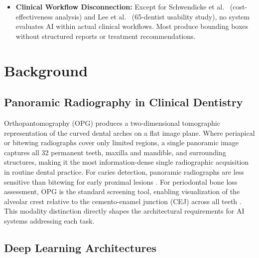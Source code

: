 \documentclass[conference]{IEEEtran}
\begin{document}
\begin{itemize}
    \item \textbf{Clinical Workflow Disconnection:} Except for
          Schwendicke et al.\ \cite{schwendicke2021cost}
          (cost-effectiveness analysis) and Lee et al.\
          \cite{lee2025evaluation} (65-dentist usability study), no
          system evaluates AI within actual clinical workflows. Most
          produce bounding boxes without structured reports or treatment
          recommendations.
\end{itemize}

\section{Background}
\label{sec:background}

\subsection{Panoramic Radiography in Clinical Dentistry}

Orthopantomography (OPG) produces a two-dimensional tomographic
representation of the curved dental arches on a flat image plane. Where
periapical or bitewing radiographs cover only limited regions, a single
panoramic image captures all 32 permanent teeth, maxilla and mandible,
and surrounding structures, making it the most information-dense
single radiographic acquisition in routine dental practice. For caries
detection, panoramic radiographs are less sensitive than bitewing for
early proximal lesions \cite{perez2024ai,bizjak2024advancing,pornprasertsuk2025clinical}.
For periodontal bone loss assessment, OPG is the standard screening
tool, enabling visualization of the alveolar crest relative to the
cemento-enamel junction (CEJ) across all teeth
\cite{jundaeng2025advanced,iacob2025automated,khubrani2025detection}.
This modality distinction directly shapes the architectural requirements
for AI systems addressing each task.

\subsection{Deep Learning Architectures}
\end{document}
